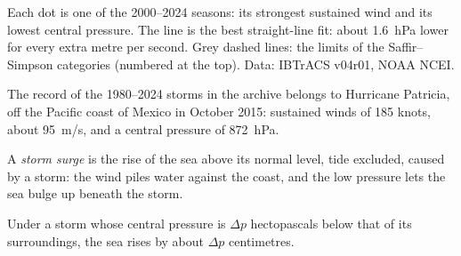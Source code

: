 \begin{omfigure}

{\small Each dot is one  of the 2000--2024 seasons: its
strongest sustained wind and its lowest central pressure. The line is the
best straight-line fit: about \qty{1.6}{hPa} lower for every extra metre per
second. Grey dashed lines: the limits of the Saffir--Simpson categories (numbered
at the top). Data: IBTrACS v04r01, NOAA NCEI.}
\end{omfigure}

The record of the 1980--2024 storms in the archive belongs to Hurricane
Patricia, off the Pacific coast of Mexico in October 2015: sustained winds
of 185 knots, about \qty{95}{m/s}, and a central pressure of \qty{872}{hPa}.

\begin{definition}\label{def:g10:storms-and-cyclones:storm-surge}
A \emph{storm surge} is the rise of the sea above its
normal level, tide excluded, caused by a storm: the wind piles water against
the coast, and the low pressure lets the sea bulge up beneath the storm.
\end{definition}

\begin{proposition}\label{prop:g10:storms-and-cyclones:bulge}
Under a storm whose central pressure is $\Delta p$ hectopascals below that
of its surroundings, the sea rises by about $\Delta p$ centimetres.
\end{proposition}

